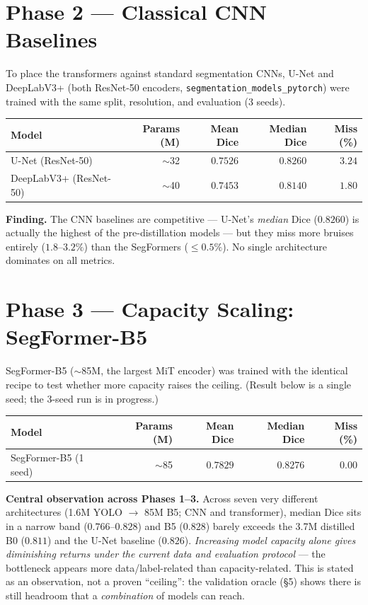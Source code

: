 \documentclass[11pt]{article}
\begin{document}
\section{Phase 2 --- Classical CNN Baselines}

To place the transformers against standard segmentation CNNs, U-Net and DeepLabV3+ (both
ResNet-50 encoders, \texttt{segmentation\_models\_pytorch}) were trained with the same split,
resolution, and evaluation (3 seeds).

\begin{center}\small
\begin{tabular}{l R R R R}
\toprule
Model & Params (M) & Mean Dice & Median Dice & Miss (\%) \\
\midrule
U-Net (ResNet-50)       & $\sim$32 & $0.7526$ & $0.8260$ & $3.24$ \\
DeepLabV3+ (ResNet-50)  & $\sim$40 & $0.7453$ & $0.8140$ & $1.80$ \\
\bottomrule
\end{tabular}
\end{center}

\textbf{Finding.} The CNN baselines are competitive --- U-Net's \emph{median} Dice ($0.8260$) is
actually the highest of the pre-distillation models --- but they miss more bruises entirely
($1.8$--$3.2\%$) than the SegFormers ($\le0.5\%$). No single architecture dominates on all metrics.

\section{Phase 3 --- Capacity Scaling: SegFormer-B5}

SegFormer-B5 ($\sim$85M, the largest MiT encoder) was trained with the identical recipe to test
whether more capacity raises the ceiling. (Result below is a single seed; the 3-seed run is
in progress.)

\begin{center}\small
\begin{tabular}{l R R R R}
\toprule
Model & Params (M) & Mean Dice & Median Dice & Miss (\%) \\
\midrule
SegFormer-B5 (1 seed) & $\sim$85 & $0.7829$ & $0.8276$ & $0.00$ \\
\bottomrule
\end{tabular}
\end{center}

\begin{keybox}
\textbf{Central observation across Phases 1--3.} Across seven very different architectures
(1.6M YOLO $\to$ 85M B5; CNN and transformer), median Dice sits in a narrow band ($0.766$--$0.828$)
and B5 ($0.828$) barely exceeds the 3.7M distilled B0 ($0.811$) and the U-Net baseline ($0.826$).
\emph{Increasing model capacity alone gives diminishing returns under the current data and
evaluation protocol} --- the bottleneck appears more data/label-related than capacity-related. This
is stated as an observation, not a proven ``ceiling'': the validation oracle (\S5) shows there is
still headroom that a \emph{combination} of models can reach.
\end{keybox}
\end{document}
